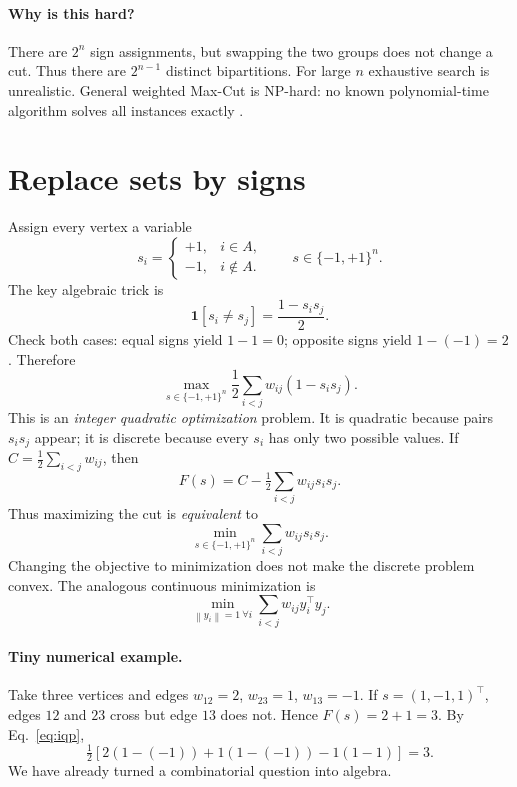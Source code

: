 \documentclass[10pt,letterpaper]{article}
\newcommand{\norm}[1]{\left\lVert#1\right\rVert}
\newcommand{\I}{\mathbf 1}
\begin{document}
\paragraph{Why is this hard?} There are $2^n$ sign assignments, but swapping the two groups does not change a cut. Thus there are $2^{n-1}$ distinct bipartitions. For large $n$ exhaustive search is unrealistic. General weighted Max-Cut is NP-hard: no known polynomial-time algorithm solves all instances exactly \cite{karp1972,goemans1995}.

\section{Replace sets by signs}
\label{sec:signs}
Assign every vertex a variable
\begin{equation}
 s_i=\begin{cases}+1,&i\in A,\\-1,&i\notin A.\end{cases}
 \qquad s\in\{-1,+1\}^n.
\end{equation}
The key algebraic trick is
\begin{equation}\label{eq:indicator}
 \I[s_i\ne s_j]=\frac{1-s_i s_j}{2}.
\end{equation}
Check both cases: equal signs yield $1-1=0$; opposite signs yield $1-(-1)=2$. Therefore
\begin{equation}\label{eq:iqp}
 \boxed{\max_{s\in\{-1,+1\}^n}
 \frac12\sum_{i<j}w_{ij}(1-s_is_j).}
\end{equation}
This is an \emph{integer quadratic optimization} problem. It is quadratic because pairs $s_is_j$ appear; it is discrete because every $s_i$ has only two possible values. If $C=\tfrac12\sum_{i<j}w_{ij}$, then
\begin{equation}\label{eq:spin-min}
 F(s)=C-\tfrac12\sum_{i<j}w_{ij}s_is_j.
\end{equation}
Thus maximizing the cut is \emph{equivalent} to
\begin{equation*}
 \min_{s\in\{-1,+1\}^n}\sum_{i<j}w_{ij}s_is_j.
\end{equation*}
Changing the objective to minimization does not make the discrete problem convex. The analogous continuous minimization is
\begin{equation*}
 \min_{\norm{y_i}=1\ \forall i}
 \sum_{i<j}w_{ij}y_i^\top y_j.
\end{equation*}


\paragraph{Tiny numerical example.} Take three vertices and edges $w_{12}=2$, $w_{23}=1$, $w_{13}=-1$. If $s=(1,-1,1)^\top$, edges $12$ and $23$ cross but edge $13$ does not. Hence $F(s)=2+1=3$. By Eq.~\eqref{eq:iqp},
\begin{equation*}
 \tfrac12[2(1-(-1))+1(1-(-1))
    -1(1-1)]=3.
\end{equation*}
We have already turned a combinatorial question into algebra.
\end{document}
